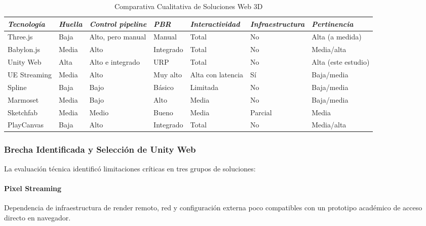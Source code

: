 \begin{table}[htbp]
\setlength{\tabcolsep}{3.5pt}
\caption{Comparativa Cualitativa de Soluciones Web 3D}
\label{tab:comparativa_cualitativa_soluciones_web3d}
\begin{tabularx}{\textwidth}{@{}>{\RaggedRight\arraybackslash}p{2.0cm}>{\RaggedRight\arraybackslash}p{1.3cm}>{\RaggedRight\arraybackslash}p{2.5cm}>{\RaggedRight\arraybackslash}p{1.8cm}>{\RaggedRight\arraybackslash}p{2.8cm}>{\RaggedRight\arraybackslash}p{3.0cm}>{\RaggedRight\arraybackslash}X@{}}
\hline
\textit{Tecnología} & \textit{Huella} & \textit{Control pipeline} & \textit{PBR} & \textit{Interactividad} & \textit{Infraestructura} & \textit{Pertinencia} \\ \hline
Three.js & Baja & Alto, pero manual & Manual & Total & No & Alta (a medida) \\
Babylon.js & Media & Alto & Integrado & Total & No & Media/alta \\
Unity Web & Alta & Alto e integrado & URP & Total & No & Alta (este estudio) \\
UE Streaming & Media & Alto & Muy alto & Alta con latencia & Sí & Baja/media \\
Spline & Baja & Bajo & Básico & Limitada & No & Baja/media \\
Marmoset & Media & Bajo & Alto & Media & No & Baja/media \\
Sketchfab & Media & Medio & Bueno & Media & Parcial & Media \\
PlayCanvas & Baja & Alto & Integrado & Total & No & Media/alta \\ \hline
\end{tabularx}
\end{table}

\subsubsection{Brecha Identificada y Selección de Unity Web}

La evaluación técnica identificó limitaciones críticas en tres grupos de soluciones:

\paragraph{Pixel Streaming} Dependencia de infraestructura de render remoto, red y configuración externa poco compatibles con un prototipo académico de acceso directo en navegador.

